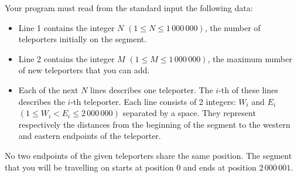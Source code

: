 Your program must read from the standard input the following data:
\begin{itemize}
\item Line 1 contains the integer $N$ $(1 \le N \le 1\,000\,000)$, the number of teleporters initially on the segment.
\item Line 2 contains the integer $M$ $(1 \le M \le 1\,000\,000)$, the maximum number of new teleporters that you can add.
\item Each of the next $N$ lines describes one teleporter. The $i$-th of these lines describes the $i$-th teleporter. Each line consists of 2 integers: $W_i$ and $E_i$ $(1 \le W_i < E_i \le 2\,000\,000)$ separated by a space. They represent respectively the distances from the beginning of the segment to the western and eastern endpoints of the teleporter.
\end{itemize}

No two endpoints of the given teleporters share the same position. The segment that you will be travelling on starts at position $0$ and ends at position $2\,000\,001$.  
